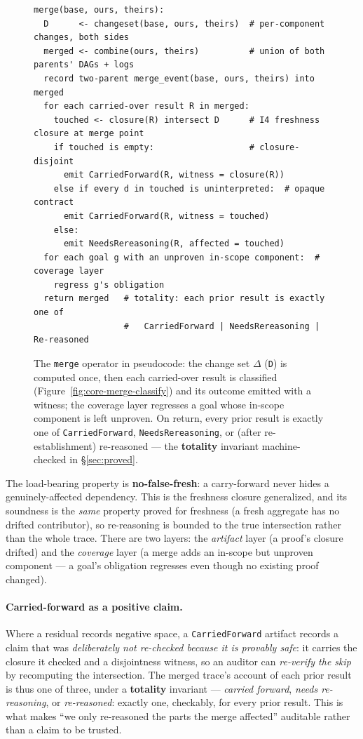 \documentclass[11pt]{article}
\newcommand{\codeus}{\textunderscore\penalty100\relax}
\newcommand{\code}[1]{\texttt{\let\_\codeus #1}}
\begin{document}
\begin{figure}[H]
\begin{lstlisting}[language=Pseudo]
merge(base, ours, theirs):
  D      <- changeset(base, ours, theirs)  # per-component changes, both sides
  merged <- combine(ours, theirs)          # union of both parents' DAGs + logs
  record two-parent merge_event(base, ours, theirs) into merged
  for each carried-over result R in merged:
    touched <- closure(R) intersect D      # I4 freshness closure at merge point
    if touched is empty:                   # closure-disjoint
      emit CarriedForward(R, witness = closure(R))
    else if every d in touched is uninterpreted:  # opaque contract
      emit CarriedForward(R, witness = touched)
    else:
      emit NeedsRereasoning(R, affected = touched)
  for each goal g with an unproven in-scope component:  # coverage layer
    regress g's obligation
  return merged   # totality: each prior result is exactly one of
                  #   CarriedForward | NeedsRereasoning | Re-reasoned
\end{lstlisting}
\caption{The \code{merge} operator in pseudocode: the change set $\Delta$ (\code{D}) is computed once, then
each carried-over result is classified (Figure~\ref{fig:core-merge-classify}) and its outcome emitted with a
witness; the coverage layer regresses a goal whose in-scope component is left unproven. On return, every
prior result is exactly one of \code{CarriedForward}, \code{NeedsRereasoning}, or (after re-establishment)
re-reasoned --- the \textbf{totality} invariant machine-checked in \S\ref{sec:proved}.}
\label{fig:merge-pseudocode}
\end{figure}
The load-bearing property is \textbf{no-false-fresh}: a carry-forward never hides a genuinely-affected
dependency. This is the freshness closure generalized, and its soundness is the \emph{same} property proved
for freshness (a fresh aggregate has no drifted contributor), so re-reasoning is bounded to the true
intersection rather than the whole trace. There are two layers: the \emph{artifact} layer (a proof's
closure drifted) and the \emph{coverage} layer (a merge adds an in-scope but unproven component --- a goal's
obligation regresses even though no existing proof changed).

\paragraph{Carried-forward as a positive claim.} Where a residual records negative space, a
\code{CarriedForward} artifact records a claim that was \emph{deliberately not re-checked because it is
provably safe}: it carries the closure it checked and a disjointness witness, so an auditor can
\emph{re-verify the skip} by recomputing the intersection. The merged trace's account of each prior result
is thus one of three, under a \textbf{totality} invariant --- \emph{carried forward}, \emph{needs
re-reasoning}, or \emph{re-reasoned}: exactly one, checkably, for every prior result. This is what makes
``we only re-reasoned the parts the merge affected'' auditable rather than a claim to be trusted.
\end{document}
